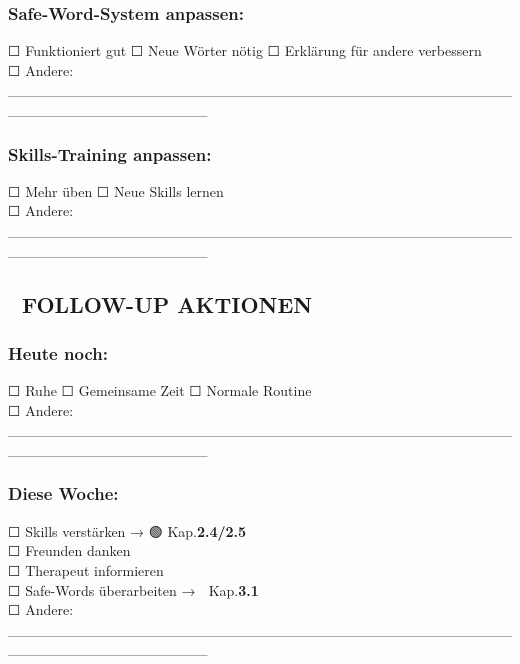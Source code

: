 \hypertarget{safe-word-system-anpassen}{%
\subsubsection{\texorpdfstring{\textbf{Safe-Word-System anpassen:}}{Safe-Word-System anpassen:}}\label{safe-word-system-anpassen}}

☐ Funktioniert gut ☐ Neue Wörter nötig ☐ Erklärung für andere verbessern\\
☐ Andere: \_\_\_\_\_\_\_\_\_\_\_\_\_\_\_\_\_\_\_\_\_\_\_\_\_\_\_\_\_\_\_\_\_\_\_\_\_\_\_\_\_\_\_\_\_\_\_\_\_\_\_\_\_\_\_\_\_\_\_\_\_\_\_\_\_\_\_

\hypertarget{skills-training-anpassen}{%
\subsubsection{\texorpdfstring{\textbf{Skills-Training anpassen:}}{Skills-Training anpassen:}}\label{skills-training-anpassen}}

☐ Mehr üben ☐ Neue Skills lernen\\
☐ Andere: \_\_\_\_\_\_\_\_\_\_\_\_\_\_\_\_\_\_\_\_\_\_\_\_\_\_\_\_\_\_\_\_\_\_\_\_\_\_\_\_\_\_\_\_\_\_\_\_\_\_\_\_\_\_\_\_\_\_\_\_\_\_\_\_\_\_\_

\hypertarget{follow-up-aktionen}{%
\subsection{\texorpdfstring{\textbf{🎯 FOLLOW-UP AKTIONEN}}{🎯 FOLLOW-UP AKTIONEN}}\label{follow-up-aktionen}}

\hypertarget{heute-noch}{%
\subsubsection{\texorpdfstring{\textbf{Heute noch:}}{Heute noch:}}\label{heute-noch}}

☐ Ruhe ☐ Gemeinsame Zeit ☐ Normale Routine\\
☐ Andere: \_\_\_\_\_\_\_\_\_\_\_\_\_\_\_\_\_\_\_\_\_\_\_\_\_\_\_\_\_\_\_\_\_\_\_\_\_\_\_\_\_\_\_\_\_\_\_\_\_\_\_\_\_\_\_\_\_\_\_\_\_\_\_\_\_\_\_

\hypertarget{diese-woche}{%
\subsubsection{\texorpdfstring{\textbf{Diese Woche:}}{Diese Woche:}}\label{diese-woche}}

☐ Skills verstärken → 🟢 Kap.\textbf{2.4/2.5}\\
☐ Freunden danken\\
☐ Therapeut informieren\\
☐ Safe-Words überarbeiten → 🔴 Kap.\textbf{3.1}\\
☐ Andere: \_\_\_\_\_\_\_\_\_\_\_\_\_\_\_\_\_\_\_\_\_\_\_\_\_\_\_\_\_\_\_\_\_\_\_\_\_\_\_\_\_\_\_\_\_\_\_\_\_\_\_\_\_\_\_\_\_\_\_\_\_\_\_\_\_\_\_

